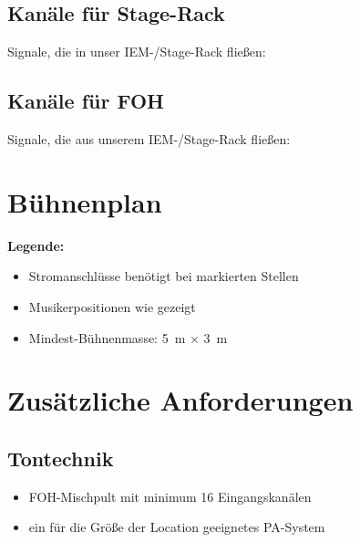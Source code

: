 \documentclass{techrider}  %
\begin{document}
\subsection{Kanäle für Stage-Rack}

Signale, die in unser IEM-/Stage-Rack fließen:

\newpage
\subsection{Kanäle für FOH}

Signale, die aus unserem IEM-/Stage-Rack fließen:

\outputChannelsTable

\newpage
\section{Bühnenplan}

\drawStagePlot

\textbf{Legende:}
\begin{itemize}
    \item Stromanschlüsse benötigt bei markierten Stellen
    \item Musikerpositionen wie gezeigt
    \item Mindest-Bühnenmasse: 5 m × 3 m
\end{itemize}


\section{Zusätzliche Anforderungen}

\subsection{Tontechnik}
\begin{itemize}
    \item FOH-Mischpult mit minimum 16 Eingangskanälen
    \item ein für die Größe der Location geeignetes PA-System
\end{itemize}
\end{document}
